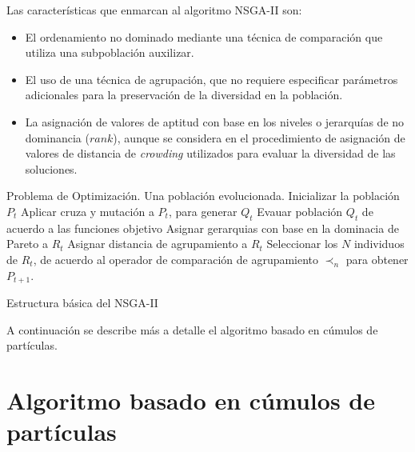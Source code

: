 \begin{itemize}
  Las caracter\'isticas que enmarcan al algoritmo NSGA-II son:

  \begin{itemize}
   \item El ordenamiento no dominado mediante una t\'ecnica de comparaci\'on que utiliza una subpoblaci\'on auxilizar.
   \item El uso de una t\'ecnica de agrupaci\'on, que no requiere especificar par\'ametros adicionales para la preservaci\'on
   de la diversidad en la poblaci\'on.
   \item La asignaci\'on de valores de aptitud con base en los niveles o jerarqu\'ias de no dominancia ($rank$), aunque se considera 
   en el procedimiento de asignaci\'on de valores de distancia de \textit{crowding} utilizados para evaluar la diversidad de las 
   soluciones.
  \end{itemize}


  
  \begin{algorithm}
      \begin{algorithmic}[1]			
	\REQUIRE Problema de Optimizaci\'on.
	\ENSURE Una poblaci\'on evolucionada.
	\STATE \DIFdelbegin {}\DIFdelend \DIFaddbegin {}\DIFaddend \STATE Inicializar la poblaci\'on $P_t$
	    \STATE Aplicar cruza y mutaci\'on a $P_t$, para generar $Q_t$
	    \STATE Evauar poblaci\'on $Q_t$ de acuerdo a las funciones objetivo
	    \STATE \DIFdelbegin {}\DIFdelend \DIFaddbegin {}\DIFaddend \STATE Asignar gerarquias con base en la dominacia de Pareto a $R_t$
	    \STATE Asignar distancia de agrupamiento a $R_t$
	    \STATE Seleccionar los $N$ individuos de $R_t$, de acuerdo al operador de comparaci\'on de agrupamiento
	    $\prec_n$ para obtener $P_{t+1}$.
	    \STATE \DIFdelbegin {}\DIFdelend \DIFaddbegin {}\DIFaddend \ENDWHILE
      \end{algorithmic}
  \caption{Estructura b\'asica del NSGA-II}
  \label{alg:NSGA-II}
  \end{algorithm}

  
  \end{itemize}
  A continuaci\'on se describe m\'as a detalle el algoritmo basado en c\'umulos de part\'iculas.

\section{Algoritmo basado en c\'umulos de part\'iculas}

